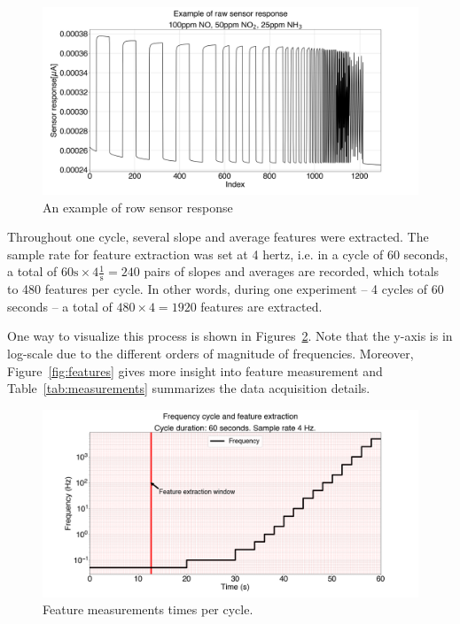 \begin{figure}[!htb]
	\centering
	\includegraphics[width=1\textwidth]{../figures/raw-response.png}
	\caption{An example of row sensor response}
	\label{fig:raw}
\end{figure}

Throughout one cycle, several slope and average features were extracted. The sample rate for feature extraction was set at 4 \acrshort{hertz}, i.e. in a cycle of 60 seconds, a total of $60 \text{s} \times 4 \frac{1}{\text{s}} = 240$ pairs of slopes and averages are recorded, which totals to 480 features per cycle. In other words, during one experiment --  4 cycles of 60 seconds -- a total of $480 \times 4 = 1920$ features are extracted. 

One way to visualize this process is shown in Figures~\ref{fig:feat-window}. Note that the y-axis is in log-scale due to the different orders of magnitude of frequencies. Moreover, Figure~\ref{fig:features} gives more insight into feature measurement and Table~\ref{tab:measurements} summarizes the data acquisition details.

\begin{figure}[!htb]
	\centering
	\includegraphics[width=1\textwidth]{../figures/measurement-windows.png}
	
	\caption{Feature measurements times per cycle.}
	\label{fig:feat-window}
\end{figure} 

